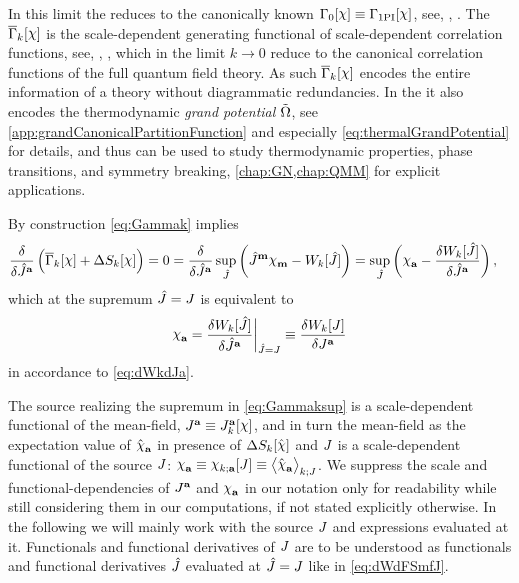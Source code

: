 In this limit the \eaa{} reduces to the canonically known \ea{} $\FSea_0[\FSmf{\FSsf}]\equiv\Gamma_\mathrm{1PI}[\FSmf{\FSsf}]$, see, \eg{}, .
The \eaa{} $\FSeaa_k[\FSmf{\FSsf}]$ is the scale-dependent generating functional of scale-dependent \ipi{} correlation functions, see, \eg{}, , which in the \ir{} limit $k\rightarrow 0$ reduce to the canonical \ipi{} correlation functions of the full quantum field theory.
As such $\FSeaa_k[\FSmf{\FSsf}]$ encodes the entire information of a theory without diagrammatic redundancies.
In the \ir{} it also encodes the thermodynamic \textit{grand potential} $\tilde{\Omega}$, see \cref{app:grandCanonicalPartitionFunction} and especially \cref{eq:thermalGrandPotential} for details, and thus can be used to study thermodynamic properties, phase transitions, and symmetry breaking, \cf{} \cref{chap:GN,chap:QMM} for explicit applications.

By construction \cref{eq:Gammak} implies
\begin{align}
	\frac{\delta}{\delta \FSfu{J}{a}}\del{\FSeaa_k[\FSmf{\FSsf}]+\Delta S_k[\FSmf{\FSsf}] }=0&=\frac{\delta}{\delta \FSfu{J}{a}}\sup_{\FSf{J}}\del[3]{
	\FSfu{J}{m}\FSmfd{\FSsf}{m}-W_k[\FSf{J}]
	}
	=\sup_{\FSf{J}}\del[3]{
	\FSmfd{\FSsf}{a}-\frac{\delta W_k[\FSf{J}]}{\delta\FSfu{J}{a}}},
\end{align}
which at the supremum $\hat{J}={J}$ is equivalent to 
\begin{align}
\FSmfd{\FSsf}{a}=\eval[3]{\frac{\delta W_k[\FSf{J}]}{\delta\FSfu{J}{a}}}_{\FSf{J}=\FSmf{J}}\equiv \frac{\delta W_k[\FSmf{J}]}{\delta\FSmfu{J}{a}}\label{eq:dWdFSmfJ}
\end{align}
in accordance to \cref{eq:dWkdJa}.

The source realizing the supremum in \cref{eq:Gammaksup} is a scale-dependent functional of the mean-field, $\FSmfu{J}{a}\equiv \FSmf{J}_k^{\FSidx{a}}[\FSmf{\FSsf}]$, and in turn the mean-field as the expectation value of $\FSfd{\FSsf}{a}$ in presence of $\Delta S_k[\FSf{\FSsf}]$ and ${J}$ is a scale-dependent functional of the source ${J}$: $\FSmfd{\FSsf}{a}\equiv\FSmf{\FSsf}_{k;\FSidx{a}}[\FSmf{J}]\equiv \expectationValue{\FSfd{\FSsf}{a}}{\FSmf{J}}$.
We suppress the scale and functional-dependencies of ${J}^{\textbf{a}}$ and $\FSmfd{\FSsf}{a}$ in our notation only for readability while still considering them in our computations, if not stated explicitly otherwise.
In the following we will mainly work with the source ${J}$ and expressions evaluated at it.
Functionals and functional derivatives of ${J}$ are to be understood as functionals and functional derivatives \wrt{} $\hat{J}$ evaluated at $\hat{J}={J}$ like in \cref{eq:dWdFSmfJ}.

